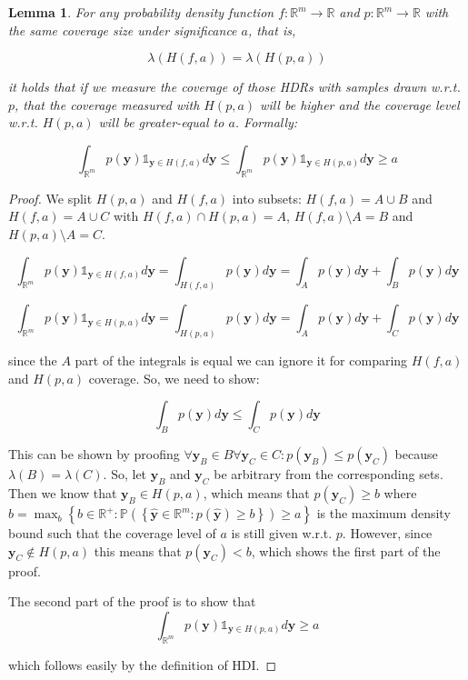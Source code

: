 \documentclass{article}
\newtheorem{lemma}[theorem]{Lemma}
\theoremstyle{definition}
\begin{document}
\begin{lemma}\label{lem:hdr_optimality_mll}
For any probability density function $f: \mathbb{R}^m \to \mathbb{R}$ and $p: \mathbb{R}^m \to \mathbb{R}$ with the same coverage size under significance $a$, that is,

$$\lambda(H(f, a)) = \lambda(H(p,a))$$

it holds that if we measure the coverage of those HDRs with samples drawn w.r.t. $p$, that the coverage measured with $H(p,a)$ will be higher and the coverage level w.r.t. $H(p,a)$ will be greater-equal to $a$. Formally:

$$\int_{\mathbb{R}^{m}} p(\mathbf{y}) \mathds1_{\mathbf{y} \in H(f, a)} d \mathbf{y} \leq \int_{\mathbb{R}^{m}} p(\mathbf{y}) \mathds1_{\mathbf{y} \in H(p, a)} d \mathbf{y} \geq a$$
\end{lemma}
\begin{proof}
We split $H(p,a)$ and $H(f, a)$ into subsets: $H(f, a) = A \cup B$ and $H(f, a) = A \cup C$ with $H(f, a) \cap H(p,a) = A$, $H(f, a)\setminus A = B$ and $H(p, a)\setminus A = C$. 

$$\int_{\mathbb{R}^{m}} p(\mathbf{y}) \mathds1_{\mathbf{y} \in H(f, a)} d \mathbf{y} = \int_{H(f, a)} p(\mathbf{y}) d \mathbf{y} = \int_{A} p(\mathbf{y}) d \mathbf{y} + \int_{B} p(\mathbf{y}) d \mathbf{y}$$

$$\int_{\mathbb{R}^{m}} p(\mathbf{y}) \mathds1_{\mathbf{y} \in H(p, a)} d \mathbf{y} = \int_{H(p, a)} p(\mathbf{y}) d \mathbf{y} = \int_{A} p(\mathbf{y}) d \mathbf{y} + \int_{C} p(\mathbf{y}) d \mathbf{y}$$

since the $A$ part of the integrals is equal we can ignore it for comparing $H(f, a)$ and $H(p, a)$ coverage. So, we need to show:

$$\int_{B} p(\mathbf{y}) d \mathbf{y} \leq \int_{C} p(\mathbf{y}) d \mathbf{y}$$

This can be shown by proofing $\forall \mathbf{y}_B\in B \forall \mathbf{y}_C \in C: p(\mathbf{y}_B) \leq p(\mathbf{y}_C)$ because $\lambda(B) = \lambda(C)$. So, let $\mathbf{y}_B$ and $\mathbf{y}_C$ be arbitrary from the corresponding sets. Then we know that $\mathbf{y}_B \in H(p,a)$, which means that $p(\mathbf{y}_C) \geq b$ where $b = \max_{b} \left\{b \in \mathbb{R^+}: \mathbb{P}\left(\left\{\mathbf{\hat{y}} \in \mathbb{R}^m: p(\mathbf{\hat{y}}) \geq b\right\}\right) \geq a \right\}$ is the maximum density bound such that the coverage level of $a$ is still given w.r.t. $p$. However, since $\mathbf{y}_C \notin H(p,a)$ this means that $p(\mathbf{y}_C) < b$, which shows the first part of the proof.

The second part of the proof is to show that 
$$\int_{\mathbb{R}^{m}} p(\mathbf{y}) \mathds1_{\mathbf{y} \in H(p, a)} d \mathbf{y} \geq a$$

which follows easily by the definition of HDI.
\end{proof}
\end{document}
